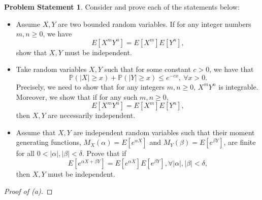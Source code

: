\documentclass[12pt,reqno]{article}
\theoremstyle{plain}
\theoremstyle{definition}
\newtheorem{problem}[theorem]{Problem Statement}
\newcommand{\PP}[1]{\ensuremath{\mathbb{P}\left(#1\right)}}
\begin{document}
\begin{problem}
Consider and prove each of the statements below:
\begin{itemize} 

\item[(a)] Assume $X,Y$ are two bounded random variables. If for any integer 
     numbers $m,n \geq 0$, we have 
     \[
     E[X^mY^n] = E[X^m] E[Y^n], 
     \]
     show that $X,Y$ must be independent. 
\item[(b)] Take random variables $X,Y$ such that for some 
     constant $c > 0$, we have that 
     \[
     \PP{|X| \geq x} + \PP{|Y| \geq x} \leq e^{-cx},\ \forall x > 0. 
     \]
     Precisely, we need to show that for any integers $m,n \geq 0$, 
     $X^mY^n$ is integrable. Moreover, we show that if for any such 
     $m,n \geq 0$, 
     \[
     E[X^mY^n] = E[X^m] E[Y^n], 
     \]
     then $X,Y$ are necessarily independent. 
\item[(c)] Assume that $X,Y$ are independent random variables such that 
     their moment generating functions, $M_X(\alpha) = E[e^{\alpha X}]$ and 
     $M_Y(\beta) = E[e^{\beta Y}]$, are finite for all 
     $0 < |\alpha|,|\beta| < \delta$. Prove that if 
     \[
     E[e^{\alpha X+\beta Y}] = E[e^{\alpha X}] E[e^{\beta Y}], 
          \forall |\alpha|,|\beta| < \delta, 
     \]
     then $X,Y$ must be independent. 

\end{itemize} 
\end{problem} 
\begin{proof}[Proof of (a)] 
\end{proof} 
\end{document}
